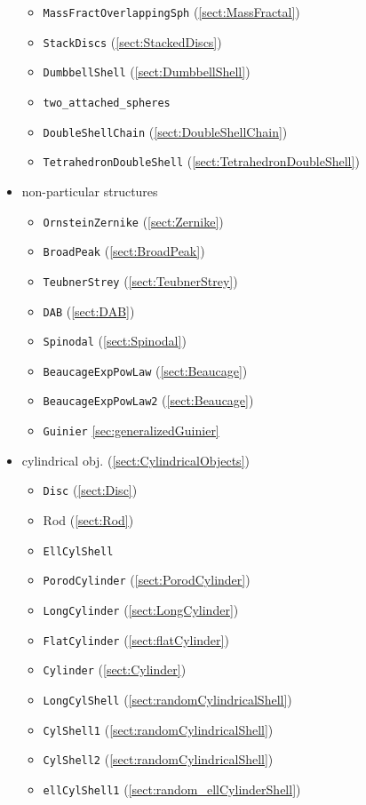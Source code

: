 \begin{itemize}
\begin{itemize}
\item \texttt{MassFractOverlappingSph} (\ref{sect:MassFractal})
\item \texttt{StackDiscs} (\ref{sect:StackedDiscs})
\item \texttt{DumbbellShell} (\ref{sect:DumbbellShell})
\item \texttt{two\_attached\_spheres}
\item \texttt{DoubleShellChain} (\ref{sect:DoubleShellChain})
\item \texttt{TetrahedronDoubleShell} (\ref{sect:TetrahedronDoubleShell})
\end{itemize}
\item non-particular structures
\begin{itemize}
\item \texttt{OrnsteinZernike} (\ref{sect:Zernike})
\item \texttt{BroadPeak} (\ref{sect:BroadPeak})
\item \texttt{TeubnerStrey} (\ref{sect:TeubnerStrey})
\item \texttt{DAB} (\ref{sect:DAB})
\item \texttt{Spinodal} (\ref{sect:Spinodal})
\item \texttt{BeaucageExpPowLaw} (\ref{sect:Beaucage})
\item \texttt{BeaucageExpPowLaw2} (\ref{sect:Beaucage})
\item \texttt{Guinier} \ref{sec:generalizedGuinier}
\end{itemize}
\item cylindrical obj. (\ref{sect:CylindricalObjects})
\begin{itemize}
\item \texttt{Disc} (\ref{sect:Disc})
\item Rod (\ref{sect:Rod})
\item \texttt{EllCylShell}
\item \texttt{PorodCylinder} (\ref{sect:PorodCylinder})
\item \texttt{LongCylinder} (\ref{sect:LongCylinder})
\item \texttt{FlatCylinder} (\ref{sect:flatCylinder})
\item \texttt{Cylinder} (\ref{sect:Cylinder})
\item \texttt{LongCylShell} (\ref{sect:randomCylindricalShell})
\item \texttt{CylShell1} (\ref{sect:randomCylindricalShell})
\item \texttt{CylShell2} (\ref{sect:randomCylindricalShell})
\item \texttt{ellCylShell1} (\ref{sect:random_ellCylinderShell})

\end{itemize}
\end{itemize}
